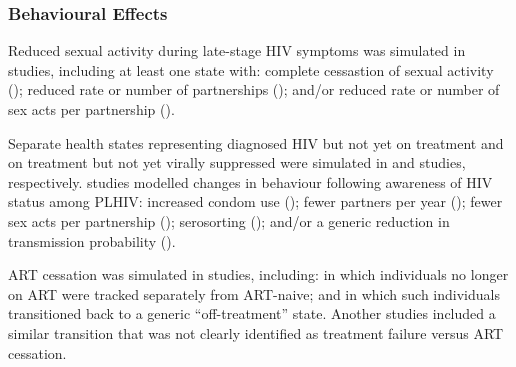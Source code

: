 \subsubsection{Behavioural Effects}
\label{sss:res:beh}
Reduced sexual activity during late-stage HIV symptoms was simulated in  studies,
including at least one state with:
complete cessastion of sexual activity ();
reduced rate or number of partnerships (); and/or
reduced rate or number of sex acts per partnership ().
\par
Separate health states representing diagnosed HIV but not yet on treatment
and on treatment but not yet virally suppressed were simulated in
 and  studies, respectively.
 studies modelled changes in behaviour following awareness of HIV status among PLHIV:
increased condom use ();
fewer partners per year ();
fewer sex acts per partnership ();
serosorting (); and/or
a generic reduction in transmission probability ().
\par
ART cessation was simulated in  studies, including:
 in which individuals no longer on ART
were tracked separately from ART-naive; and
 in which such individuals
transitioned back to a generic ``off-treatment'' state.
Another  studies included a similar transition
that was not clearly identified as treatment failure versus ART cessation.
